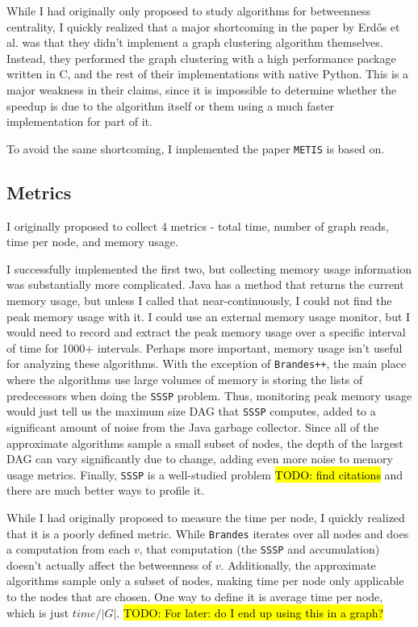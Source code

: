 \documentclass[12pt,a4paper,twoside,openright]{report}
\newcommand{\CC}{C\nolinebreak\hspace{-.05em}\raisebox{.4ex}{\tiny\bf +}\nolinebreak\hspace{-.10em}\raisebox{.4ex}{\tiny\bf +}} %
\newcommand{\todo}[1]{\hl{TODO: #1}}
\newcommand{\ttt}[1]{\texttt{#1}}
\newcommand{\erdos}{Erd\H{o}s }
\begin{document}
		While I had originally only proposed to study algorithms for betweenness centrality, I quickly realized that a major shortcoming in the paper by \erdos et al. was that they didn't implement a graph clustering algorithm themselves. Instead, they performed the graph clustering with a high performance package written in \CC, and the rest of their implementations with native Python. This is a major weakness in their claims, since it is impossible to determine whether the speedup is due to the algorithm itself or them using a much faster implementation for part of it.
		
		To avoid the same shortcoming, I implemented the paper \ttt{METIS} is based on.
		
		\subsection{Metrics}
		I originally proposed to collect 4 metrics - total time, number of graph reads, time per node, and memory usage.
		
		I successfully implemented the first two, but collecting memory usage information was substantially more complicated. Java has a method that returns the current memory usage, but unless I called that near-continuously, I could not find the peak memory usage with it. I could use an external memory usage monitor, but I would need to record and extract the peak memory usage over a specific interval of time for 1000+ intervals. Perhaps more important, memory usage isn't useful for analyzing these algorithms. With the exception of \ttt{Brandes++}, the main place where the algorithms use large volumes of memory is storing the lists of predecessors when doing the \ttt{SSSP} problem. Thus, monitoring peak memory usage would just tell us the maximum size DAG that \ttt{SSSP} computes, added to a significant amount of noise from the Java garbage collector. Since all of the approximate algorithms sample a small subset of nodes, the depth of the largest DAG can vary significantly due to change, adding even more noise to memory usage metrics. Finally, \ttt{SSSP} is a well-studied problem  \todo{find citations} and there are much better ways to profile it.
		
		While I had originally proposed to measure the time per node, I quickly realized that it is a poorly defined metric. While \ttt{Brandes} iterates over all nodes and does a computation from each $v$, that computation (the \ttt{SSSP} and accumulation) doesn't actually affect the betweenness of $v$. Additionally, the approximate algorithms sample only a subset of nodes, making time per node only applicable to the nodes that are chosen. One way to define it is average time per node, which is just $time/|G|$.  \todo{For later: do I end up using this in a graph?}
		
\end{document}
